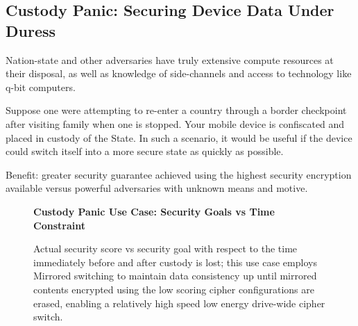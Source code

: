 \subsection{Custody Panic: Securing Device Data Under Duress}

Nation-state and other adversaries have truly extensive compute resources at
their disposal, as well as knowledge of side-channels and access to technology
like q-bit computers.

Suppose one were attempting to re-enter a country through a border checkpoint
after visiting family when one is stopped. Your mobile device is confiscated and
placed in custody of the State. In such a scenario, it would be useful if the
device could switch itself into a more secure state as quickly as possible.

Benefit: greater security guarantee achieved using the highest security
encryption available versus powerful adversaries with unknown means and motive.

\begin{figure}[ht] \textbf{Custody Panic Use Case: Security Goals vs Time
Constraint}\par\medskip
   \centering
   {} \caption{Actual security score vs
   security goal with respect to the time immediately before and after custody
   is lost; this use case employs Mirrored switching to maintain data
   consistency up until mirrored contents encrypted using the low scoring cipher
   configurations are erased, enabling a relatively high speed low energy
   drive-wide cipher switch.}
  \label{fig:usecase-custody}
\end{figure}


